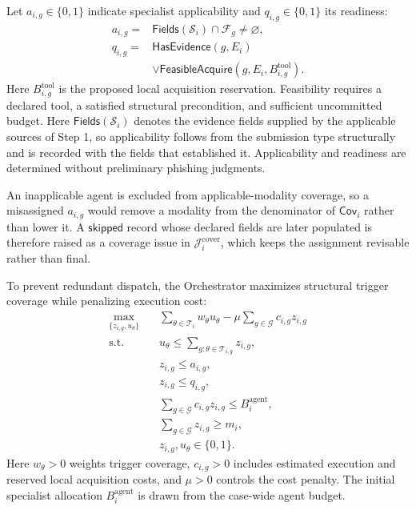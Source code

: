 Let $a_{i,g}\in\{0,1\}$ indicate
specialist applicability and
$q_{i,g}\in\{0,1\}$ its readiness:
\begin{equation}
\begin{aligned}
a_{i,g}={}&
\mathsf{Fields}(\mathcal S_i)
\cap\mathcal F_g\neq\varnothing,\\
q_{i,g}={}&
\mathsf{HasEvidence}(g,E_i)\\
&\lor\mathsf{FeasibleAcquire}
(g,E_i,B_{i,g}^{\mathrm{tool}}).
\end{aligned}
\label{eq:agent-readiness}
\end{equation}
Here $B_{i,g}^{\mathrm{tool}}$ is
the proposed local acquisition
reservation. Feasibility requires
a declared tool, a satisfied
structural precondition, and
sufficient uncommitted budget.
Here $\mathsf{Fields}(\mathcal S_i)$
denotes the evidence fields supplied by the
applicable sources of Step 1, so
applicability follows from the submission
type structurally and is recorded with the
fields that established it. Applicability
and readiness are determined without
preliminary phishing judgments.

An inapplicable agent is excluded from
applicable-modality coverage, so a
misassigned $a_{i,g}$ would remove a
modality from the denominator of
$\mathsf{Cov}_i$ rather than lower it.
A $\mathsf{skipped}$ record whose declared
fields are later populated is therefore
raised as a coverage issue in
$\mathcal J_i^{\mathrm{cover}}$, which
keeps the assignment revisable rather than
final.

To prevent redundant dispatch,
the Orchestrator maximizes
structural trigger coverage while
penalizing execution cost:
\begin{equation}
\begin{aligned}
\max_{\{z_{i,g},u_\theta\}}\quad&
\sum_{\theta\in\mathcal T_i}
w_\theta u_\theta
-\mu\sum_{g\in\mathcal G}
c_{i,g}z_{i,g}\\
\mathrm{s.t.}\quad&
u_\theta\leq
\sum_{g:\theta\in\mathcal T_{i,g}}
z_{i,g},\\
&z_{i,g}\leq a_{i,g},\\
&z_{i,g}\leq q_{i,g},\\
&\sum_{g\in\mathcal G}
c_{i,g}z_{i,g}
\leq B_i^{\mathrm{agent}},\\
&\sum_{g\in\mathcal G}
z_{i,g}\geq m_i,\\
&z_{i,g},u_\theta\in\{0,1\}.
\end{aligned}
\label{eq:specialist-selection}
\end{equation}
Here $w_\theta>0$ weights trigger
coverage, $c_{i,g}>0$ includes
estimated execution and reserved
local acquisition costs, and
$\mu>0$ controls the cost penalty.
The initial specialist allocation
$B_i^{\mathrm{agent}}$ is drawn
from the case-wide agent budget.

